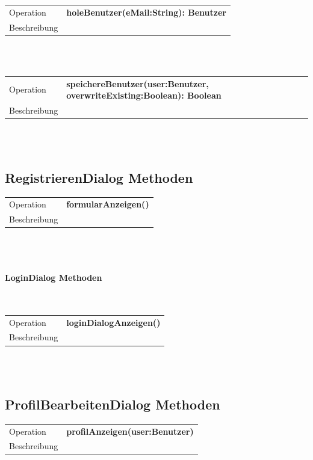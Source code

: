 \documentclass[12pt]{scrreprt}
\begin{document}
\begin{tabular}{|lp{12cm}|}
	\hline
	Operation &  \textbf{holeBenutzer(eMail:String): Benutzer}\\ 
	Beschreibung & \\ 
	\hline 
\end{tabular} \\\\

\begin{tabular}{|lp{12cm}|}
	\hline
	Operation &  \textbf{speichereBenutzer(user:Benutzer, overwriteExisting:Boolean): Boolean}\\ 
	Beschreibung & \\ 
	\hline 
\end{tabular} \\\\


\subsection{RegistrierenDialog  Methoden}

\begin{tabular}{|lp{12cm}|}
	\hline
	Operation &  \textbf{formularAnzeigen()}\\ 
	Beschreibung & \\ 
	\hline 
\end{tabular} \\\\

\paragraph{LoginDialog  Methoden}\mbox{}\\

\begin{tabular}{|lp{12cm}|}
	\hline
	Operation &  \textbf{loginDialogAnzeigen()}\\ 
	Beschreibung & \\ 
	\hline 
\end{tabular} \\\\


\subsection{ProfilBearbeitenDialog  Methoden}

\begin{tabular}{|lp{12cm}|}
	\hline
	Operation &  \textbf{profilAnzeigen(user:Benutzer)}\\ 
	Beschreibung & \\ 
	\hline 
\end{tabular} \\\\
\end{document}
